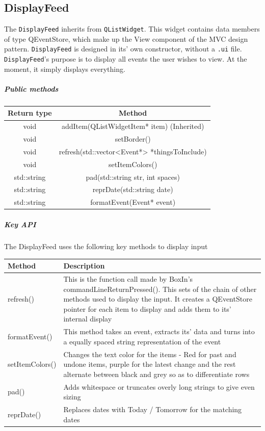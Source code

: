 \documentclass[12pt]{extarticle}
\begin{document}
\subsection{DisplayFeed}
The \texttt{DisplayFeed} inherits from \texttt{QListWidget}. This widget contains data members of type QEventStore, which make up the View component of the MVC design pattern. \texttt{DisplayFeed} is designed in its' own constructor, without a \texttt{.ui} file. \texttt{DisplayFeed}'s purpose is to display all events the user wishes to view. At the moment, it simply displays everything.
\subparagraph{Public methods}
\begin{tabular}{c c}
Return type & Method\\
\hline
void & addItem(QListWidgetItem* item) (Inherited)\\
void & setBorder()\\
void & refresh(std::vector<Event*> *thingsToInclude)\\
void & setItemColors()\\
std::string & pad(std::string str, int spaces)\\
std::string & reprDate(std::string date)\\
std::string & formatEvent(Event* event)\\
\end{tabular}

\subparagraph{Key API}The DisplayFeed uses the following key methods to display input\\
\begin{tabular}{p{6cm} p{12cm}}
Method & Description\\
\hline
refresh() & This is the function call made by BoxIn's commandLineReturnPressed(). This sets of the chain of other methods used to display the input. It creates a QEventStore pointer for each item to display and adds them to its' internal display\\
formatEvent() & This method takes an event, extracts its' data and turns into a equally spaced string representation of the event\\
setItemColors() & Changes the text color for the items - Red for past and undone items, purple for the latest change and the rest alternate between black and grey so as to differentiate rows\\
pad() & Adds whitespace or truncates overly long strings to give even sizing\\
reprDate() & Replaces dates with Today / Tomorrow for the matching dates
\end{tabular}
\end{document}
